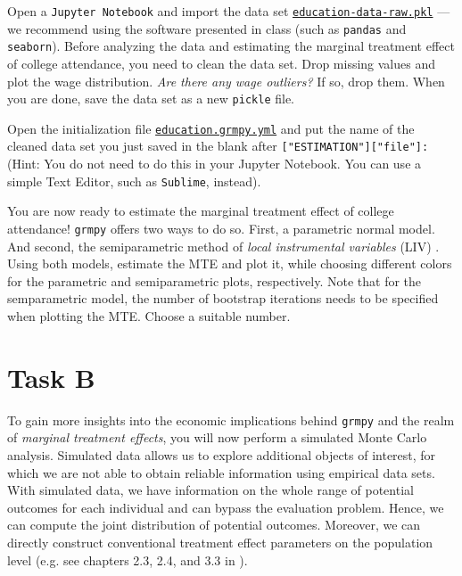\begin{boenumerate}

  \item Open a \texttt{Jupyter Notebook} and import the data set \href{https://github.com/HumanCapitalAnalysis/microeconometrics/blob/prset_grmpy/problem-sets/04-generalized-roy-model/data/education_data_raw.pkl}{\texttt{education-data-raw.pkl}} --- we recommend using the software presented in class (such as \texttt{pandas} and \texttt{seaborn}). 
  Before analyzing the data and estimating the marginal treatment effect of college attendance, you need to clean the data set. Drop missing values and plot the wage distribution. \emph{Are there any wage outliers?} If so, drop them.
  When you are done, save the data set as a new \texttt{pickle} file.
  
   \item Open the initialization file \href{https://github.com/HumanCapitalAnalysis/microeconometrics/blob/prset_grmpy/problem-sets/04-generalized-roy-model/sources/education.grmpy.yml}{\texttt{education.grmpy.yml}} and put the name of the cleaned data set you just saved in the blank after \texttt{["ESTIMATION"]["file"]:} (Hint: You do not need to do this in your Jupyter Notebook. You can use a simple Text Editor, such as \texttt{Sublime}, instead).
   
   \item You are now ready to estimate the marginal treatment effect of college attendance! \texttt{grmpy} offers two ways to do so. First, a parametric normal model. And second, the semiparametric method of \emph{local instrumental variables} (LIV) \citep{Heckman.2006d}.
   Using both models, estimate the MTE and plot it, while choosing different colors for the parametric and semiparametric plots, respectively. Note that for the semparametric model, the number of bootstrap iterations needs to be specified when plotting the MTE. Choose a suitable number.

\end{boenumerate}


\section*{Task B}

   To gain more insights into the economic implications behind \texttt{grmpy} and the realm of \emph{marginal treatment effects}, you will now perform a simulated Monte Carlo analysis. 
   Simulated data allows us to explore additional objects of interest, for which we are not able to obtain reliable information using empirical data sets. With simulated data, we have information on the whole range of potential outcomes for each individual and can bypass the evaluation problem. Hence, we can compute the joint distribution of potential outcomes. Moreover, we can directly construct conventional treatment effect parameters on the population level (e.g. see chapters 2.3, 2.4, and 3.3 in \cite{Heckman.2007e}).\\

